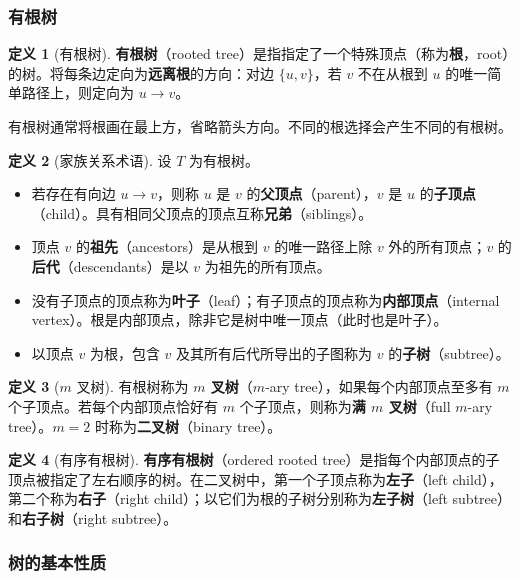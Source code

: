 \documentclass[UTF8,11pt,a4paper]{ctexbook}   %
\theoremstyle{definition}
\newtheorem{definition}{定义}[section]
\begin{document}
\subsubsection{有根树}

\begin{definition}[有根树]
\textbf{有根树}（rooted tree）是指指定了一个特殊顶点（称为\textbf{根}，root）的树。将每条边定向为\textbf{远离根}的方向：对边 $\{u,v\}$，若 $v$ 不在从根到 $u$ 的唯一简单路径上，则定向为 $u\to v$。
\end{definition}

有根树通常将根画在最上方，省略箭头方向。不同的根选择会产生不同的有根树。

\begin{definition}[家族关系术语]
设 $T$ 为有根树。
\begin{itemize}
    \item 若存在有向边 $u\to v$，则称 $u$ 是 $v$ 的\textbf{父顶点}（parent），$v$ 是 $u$ 的\textbf{子顶点}（child）。具有相同父顶点的顶点互称\textbf{兄弟}（siblings）。
    \item 顶点 $v$ 的\textbf{祖先}（ancestors）是从根到 $v$ 的唯一路径上除 $v$ 外的所有顶点；$v$ 的\textbf{后代}（descendants）是以 $v$ 为祖先的所有顶点。
    \item 没有子顶点的顶点称为\textbf{叶子}（leaf）；有子顶点的顶点称为\textbf{内部顶点}（internal vertex）。根是内部顶点，除非它是树中唯一顶点（此时也是叶子）。
    \item 以顶点 $v$ 为根，包含 $v$ 及其所有后代所导出的子图称为 $v$ 的\textbf{子树}（subtree）。
\end{itemize}
\end{definition}

\begin{definition}[$m$ 叉树]
有根树称为 \textbf{$m$ 叉树}（$m$-ary tree），如果每个内部顶点至多有 $m$ 个子顶点。若每个内部顶点恰好有 $m$ 个子顶点，则称为\textbf{满 $m$ 叉树}（full $m$-ary tree）。$m=2$ 时称为\textbf{二叉树}（binary tree）。
\end{definition}

\begin{definition}[有序有根树]
\textbf{有序有根树}（ordered rooted tree）是指每个内部顶点的子顶点被指定了左右顺序的树。在二叉树中，第一个子顶点称为\textbf{左子}（left child），第二个称为\textbf{右子}（right child）；以它们为根的子树分别称为\textbf{左子树}（left subtree）和\textbf{右子树}（right subtree）。
\end{definition}

\subsubsection{树的基本性质}
\end{document}

